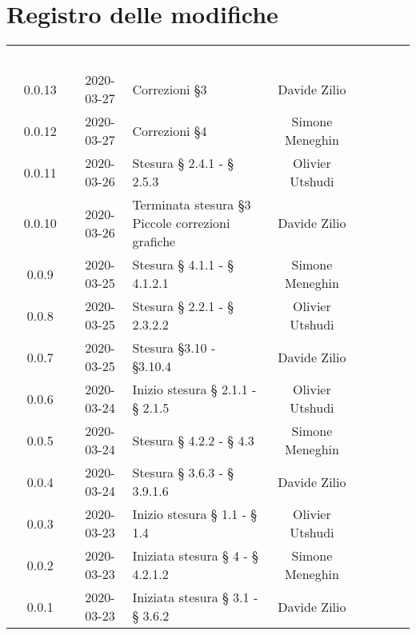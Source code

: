 \section*{Registro delle modifiche}
{
	\centering
	\begin{longtable}{ c c  C{4cm}  c  c }
		\textcolor{white}{\textbf{Versione}} & \textcolor{white}{\textbf{Data}} & \textcolor{white}{\textbf{Descrizione}} & \textcolor{white}{\textbf{Nominativo}} & \textcolor{white}{\textbf{Ruolo}}\\
		0.0.13 & 2020-03-27 & Correzioni \S 3 & Davide Zilio &\reda{}\\
		0.0.12 & 2020-03-27 & Correzioni \S 4 & Simone Meneghin &\reda{}\\
		0.0.11 & 2020-03-26 & Stesura § 2.4.1 - § 2.5.3 & Olivier Utshudi &\reda{}\\
		0.0.10 & 2020-03-26 & Terminata stesura \S 3 \newline Piccole correzioni grafiche & Davide Zilio &\reda{}\\
		0.0.9 & 2020-03-25 & Stesura § 4.1.1 - § 4.1.2.1 & Simone Meneghin &\reda{}\\	
		
		0.0.8 & 2020-03-25 & Stesura § 2.2.1 - § 2.3.2.2 & Olivier Utshudi &\reda{}\\
		
		0.0.7 & 2020-03-25 & Stesura \S 3.10 - \S 3.10.4 & Davide Zilio & \reda{}\\
		
		0.0.6 & 2020-03-24 & Inizio stesura § 2.1.1 - § 2.1.5 & Olivier Utshudi &\reda{}\\

		0.0.5 & 2020-03-24 & Stesura § 4.2.2 - § 4.3 & Simone Meneghin &\reda{}\\		
		
		0.0.4 & 2020-03-24 & Stesura § 3.6.3 - § 3.9.1.6 & Davide Zilio &\reda{}\\
		
		0.0.3 & 2020-03-23 & Inizio stesura § 1.1 - § 1.4 & Olivier Utshudi &\reda{}\\
		
		0.0.2 & 2020-03-23 & Iniziata stesura § 4 - § 4.2.1.2 & Simone Meneghin &\reda{}\\
		
		0.0.1 & 2020-03-23 & Iniziata stesura § 3.1 - § 3.6.2 & Davide Zilio &\reda{}\\		
		
	\end{longtable}

}